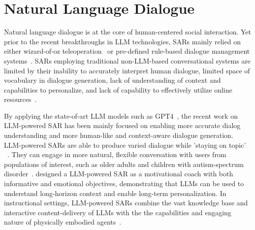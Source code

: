 \documentclass[
twocolumn,
]{ceurart}
\begin{document}
\section{Natural Language Dialogue }

Natural language dialogue is at the core of human-centered social interaction. Yet prior to the recent breakthroughs in LLM technologies, SARs mainly relied on either wizard-of-oz teleoperation~\cite{erich2017systematic} or pre-defined rule-based dialogue management systems~\cite{erich2017systematic, youssef2022survey}. SARs employing traditional non-LLM-based conversational systems are limited by their inability to accurately interpret human dialogue, limited space of vocabulary in dialogue generation, lack of understanding of context and capabilities to personalize, and lack of capability to effectively utilize online resources~\cite{grassi2022knowledge}.





By applying the state-of-art LLM models such as GPT4~\cite{achiam2023gpt}, the recent work on LLM-powered SAR has been mainly focused on enabling more accurate dialog understanding and more human-like and context-aware dialogue generation. LLM-powered SARs are able to produce varied dialogue while 'staying on topic' ~\cite{billing2023language}. They can engage in more natural, flexible conversation with users from populations of interest, such as older adults and children with autism-spectrum disorder~\cite{bertacchini2023social}. \citet{spitale2023vita} designed a LLM-powered SAR as a motivational coach with both informative and emotional objectives, demonstrating that LLMs can be used to understand long-horizon context and enable long-term personalization. In instructional settings, LLM-powered SARs combine the vast knowledge base and interactive content-delivery of LLMs with the the capabilities and engaging nature of physically embodied agents~\cite{wake2023gpt}. 
\end{document}
